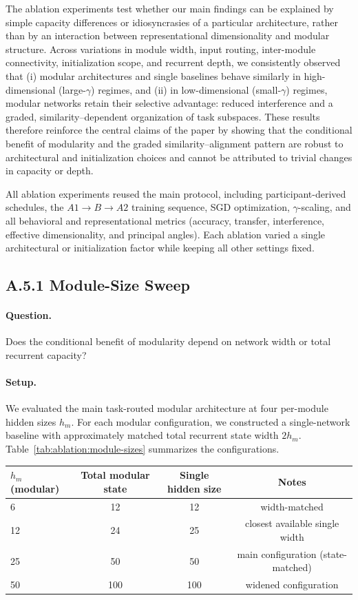 \documentclass{article}
\theoremstyle{plain}
\theoremstyle{definition}
\theoremstyle{remark}
\begin{document}
The ablation experiments test whether our main findings can be explained by simple capacity differences or idiosyncrasies of a particular architecture, rather than by an interaction between representational dimensionality and modular structure. Across variations in module width, input routing, inter-module connectivity, initialization scope, and recurrent depth, we consistently observed that (i) modular architectures and single baselines behave similarly in high-dimensional (large-$\gamma$) regimes, and (ii) in low-dimensional (small-$\gamma$) regimes, modular networks retain their selective advantage: reduced interference and a graded, similarity–dependent organization of task subspaces. These results therefore reinforce the central claims of the paper by showing that the conditional benefit of modularity and the graded similarity–alignment pattern are robust to architectural and initialization choices and cannot be attributed to trivial changes in capacity or depth.

All ablation experiments reused the main protocol, including participant-derived schedules, the $A1 \rightarrow B \rightarrow A2$ training sequence, SGD optimization, $\gamma$-scaling, and all behavioral and representational metrics (accuracy, transfer, interference, effective dimensionality, and principal angles). Each ablation varied a single architectural or initialization factor while keeping all other settings fixed.

\subsection{A.5.1 Module-Size Sweep}

\paragraph{Question.}
Does the conditional benefit of modularity depend on network width or total recurrent capacity?

\paragraph{Setup.}
We evaluated the main task-routed modular architecture at four per-module hidden sizes $h_m$.
For each modular configuration, we constructed a single-network baseline with approximately matched total recurrent state width $2h_m$.
Table~\ref{tab:ablation:module-sizes} summarizes the configurations.

\begin{center}
\begin{tabular}{lccc}
\toprule
$h_m$ (modular) & Total modular state & Single hidden size & Notes \\
\midrule
6  & 12 & 12  & width-matched \\
12 & 24 & 25  & closest available single width \\
25 & 50 & 50  & main configuration (state-matched) \\
50 & 100 & 100 & widened configuration \\
\bottomrule
\end{tabular}
\end{center}
\label{tab:ablation:module-sizes}
\end{document}
